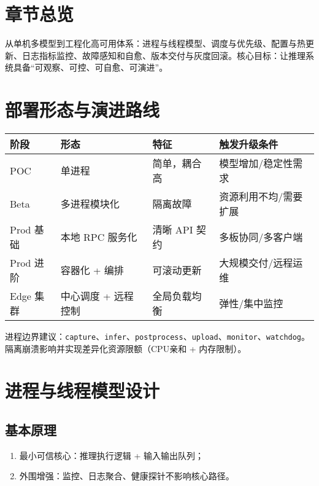\section{章节总览}\label{ux7ae0ux8282ux603bux89c8}

从单机多模型到工程化高可用体系：进程与线程模型、调度与优先级、配置与热更新、日志指标监控、故障感知和自愈、版本交付与灰度回滚。核心目标：让推理系统具备``可观察、可控、可自愈、可演进''。

\section{部署形态与演进路线}\label{ux90e8ux7f72ux5f62ux6001ux4e0eux6f14ux8fdbux8defux7ebf}

\begin{longtable}[]{@{}llll@{}}
\toprule\noalign{}
阶段 & 形态 & 特征 & 触发升级条件 \\
\midrule\noalign{}
\endhead
\bottomrule\noalign{}
\endlastfoot
POC & 单进程 & 简单，耦合高 & 模型增加/稳定性需求 \\
Beta & 多进程模块化 & 隔离故障 & 资源利用不均/需要扩展 \\
Prod 基础 & 本地 RPC 服务化 & 清晰 API 契约 & 多板协同/多客户端 \\
Prod 进阶 & 容器化 + 编排 & 可滚动更新 & 大规模交付/远程运维 \\
Edge 集群 & 中心调度 + 远程控制 & 全局负载均衡 & 弹性/集中监控 \\
\end{longtable}

进程边界建议：\passthrough{\lstinline!capture!}、\passthrough{\lstinline!infer!}、\passthrough{\lstinline!postprocess!}、\passthrough{\lstinline!upload!}、\passthrough{\lstinline!monitor!}、\passthrough{\lstinline!watchdog!}。隔离崩溃影响并实现差异化资源限额（CPU亲和
+ 内存限制）。

\section{进程与线程模型设计}\label{ux8fdbux7a0bux4e0eux7ebfux7a0bux6a21ux578bux8bbeux8ba1}

\subsection{基本原理}\label{ux57faux672cux539fux7406}

\begin{enumerate}
\def\labelenumi{\arabic{enumi}.}
\tightlist
\item
  最小可信核心：推理执行逻辑 + 输入输出队列；
\item
  外围增强：监控、日志聚合、健康探针不影响核心路径。
\end{enumerate}

